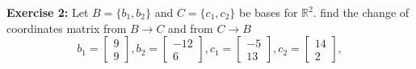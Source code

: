 \documentclass{amsart}
\def\RR{{\mathbb R}}
\begin{document}
\noindent\textbf{Exercise 2: }Let $B = \{b_1,b_2\}$ and $C = \{c_1,c_2\}$ be bases for $\RR^2$. find the change of coordinates matrix from $B \to C$ and from $C \to B$
\begin{equation*}
b_1 =
\begin{bmatrix}
9\\
9
\end{bmatrix},
b_2 =
\begin{bmatrix}
-12\\
6
\end{bmatrix},
c_1 =
\begin{bmatrix}
-5\\
13
\end{bmatrix},
c_2 =
\begin{bmatrix}
14\\
2
\end{bmatrix},
\end{equation*}
\end{document}
